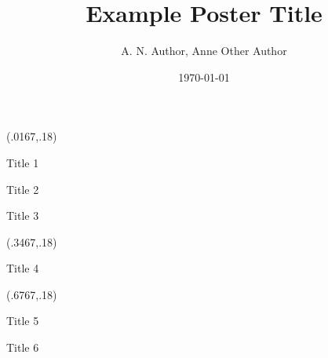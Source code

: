 \documentclass{beamer}
\title{ 	
	Example Poster Title 
	}
\author{A. N. Author, Anne Other Author}
\date{\today}
\begin{document}
\begin{frame}[t]
\maketitle
\makefooter

\vspace*{1cm}
\begin{textblock}{.3}(.0167,.18)
\begin{block}{\fontsize{50}{150}\selectfont Title 1}
\vspace{0.5cm}
\justifying
\fontsize{40}{40}\selectfont %
\end{block}
%
\vspace{2cm}
\begin{block}{\fontsize{50}{150}\selectfont Title 2}
\justifying
\fontsize{40}{40}\selectfont %
\vspace{2cm}
\end{block}
%
\begin{block}{\fontsize{50}{150}\selectfont Title 3}
\justifying
\fontsize{40}{40}\selectfont %
\end{block}
\end{textblock}
%
\begin{textblock}{.3}(.3467,.18)
\begin{block}{\fontsize{50}{150}\selectfont Title 4}
\justifying
\fontsize{40}{40}\selectfont %
\end{block}
\end{textblock}

\begin{textblock}{.3}(.6767,.18)
\begin{block}{\fontsize{50}{150}\selectfont Title 5}
\justifying
\fontsize{40}{40}\selectfont %
\end{block}
\begin{block}{\fontsize{50}{150}\selectfont Title 6}
\justifying
\fontsize{40}{40}\selectfont %
\end{block}
\end{textblock}
\end{frame}
\end{document}
